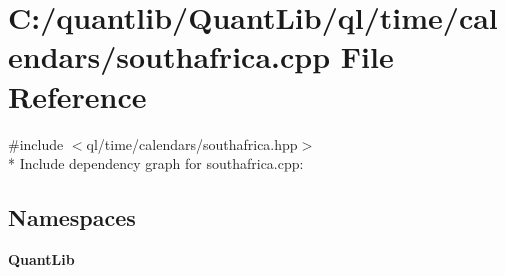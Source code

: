 \section{C\+:/quantlib/\+Quant\+Lib/ql/time/calendars/southafrica.cpp File Reference}
\label{southafrica_8cpp}
{\ttfamily \#include $<$ql/time/calendars/southafrica.\+hpp$>$}\\*
Include dependency graph for southafrica.\+cpp\+:
\subsection*{Namespaces}
\begin{DoxyCompactItemize}
\item 
 {\bf Quant\+Lib}
\end{DoxyCompactItemize}
